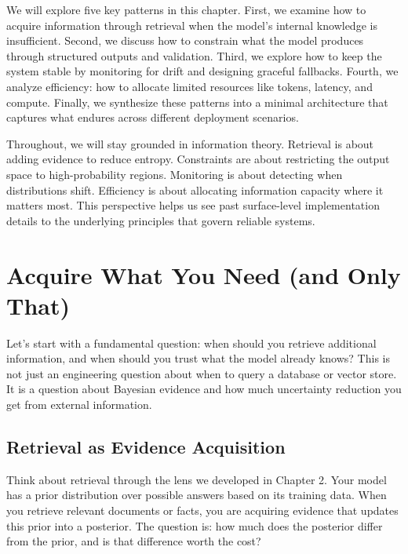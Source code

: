 We will explore five key patterns in this chapter. First, we examine how to acquire information through retrieval when the model's internal knowledge is insufficient. Second, we discuss how to constrain what the model produces through structured outputs and validation. Third, we explore how to keep the system stable by monitoring for drift and designing graceful fallbacks. Fourth, we analyze efficiency: how to allocate limited resources like tokens, latency, and compute. Finally, we synthesize these patterns into a minimal architecture that captures what endures across different deployment scenarios.

Throughout, we will stay grounded in information theory. Retrieval is about adding evidence to reduce entropy. Constraints are about restricting the output space to high-probability regions. Monitoring is about detecting when distributions shift. Efficiency is about allocating information capacity where it matters most. This perspective helps us see past surface-level implementation details to the underlying principles that govern reliable systems.

\vspace{2em}

\section{Acquire What You Need (and Only That)}

Let's start with a fundamental question: when should you retrieve additional information, and when should you trust what the model already knows? This is not just an engineering question about when to query a database or vector store. It is a question about Bayesian evidence and how much uncertainty reduction you get from external information.

\vspace{1em}

\subsection{Retrieval as Evidence Acquisition}

Think about retrieval through the lens we developed in Chapter 2. Your model has a prior distribution over possible answers based on its training data. When you retrieve relevant documents or facts, you are acquiring evidence that updates this prior into a posterior. The question is: how much does the posterior differ from the prior, and is that difference worth the cost?

